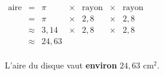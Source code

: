 \documentclass[../main.tex]{subfiles}
\begin{document}
            \begin{exemple}\medskip\par\noindent
                \begin{minipage}{.49\linewidth}
                \end{minipage}\hspace{0.01\linewidth}
                \begin{minipage}{.49\linewidth}
                    $\begin{array}{ccccccc}
                        \text{aire}&=&\pi&\times&\text{rayon}&\times&\text{rayon}\\
                        &=&\pi&\times&2,8&\times&2,8\\
                        &\approx&3,14&\times&2,8&\times&2,8\\
                        &\approx&24,63&&&\\
                    \end{array}$\bigskip\par\noindent
                    L'aire du disque vaut {\bfseries environ} $24,63$ cm$^2$.
                \end{minipage}
            \end{exemple}
\end{document}
